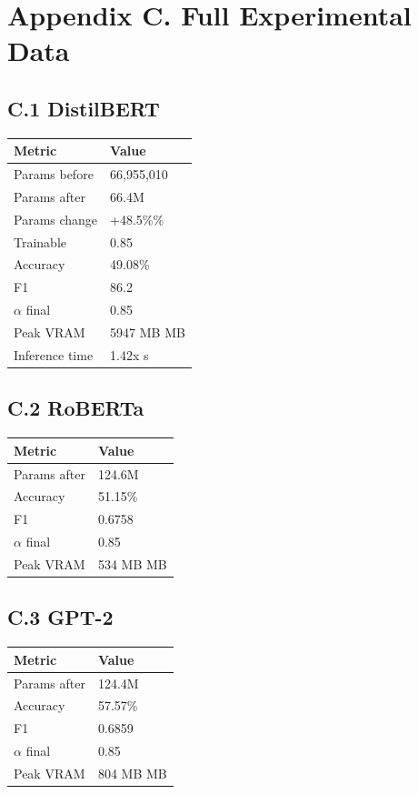 \section{Appendix C. Full Experimental Data}

\subsection{C.1 DistilBERT}

\begin{table}[H]
\centering
\small
\begin{tabular}{ll}
\toprule
\textbf{Metric} & \textbf{Value} \\
\midrule
Params before & 66,955,010 \\
Params after & 66.4M \\
Params change & +48.5\%\% \\
Trainable & 0.85 \\
Accuracy & 49.08\% \\
F1 & 86.2 \\
$\alpha$ final & 0.85 \\
Peak VRAM & 5947 MB MB \\
Inference time & 1.42x s \\
\bottomrule
\end{tabular}
\end{table}

\subsection{C.2 RoBERTa}

\begin{table}[H]
\centering
\small
\begin{tabular}{ll}
\toprule
\textbf{Metric} & \textbf{Value} \\
\midrule
Params after & 124.6M \\
Accuracy & 51.15\% \\
F1 & 0.6758 \\
$\alpha$ final & 0.85 \\
Peak VRAM & 534 MB MB \\
\bottomrule
\end{tabular}
\end{table}

\subsection{C.3 GPT-2}

\begin{table}[H]
\centering
\small
\begin{tabular}{ll}
\toprule
\textbf{Metric} & \textbf{Value} \\
\midrule
Params after & 124.4M \\
Accuracy & 57.57\% \\
F1 & 0.6859 \\
$\alpha$ final & 0.85 \\
Peak VRAM & 804 MB MB \\
\bottomrule
\end{tabular}
\end{table}


